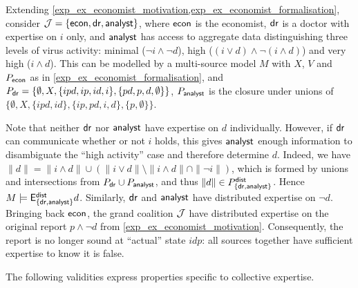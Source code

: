 \begin{example}
\label{exp_ex_mutlisource}

    Extending \cref{exp_ex_economist_motivation,exp_ex_economist_formalisation},
    consider $\mathcal{J} = \{\mathsf{econ}, \mathsf{dr}, \mathsf{analyst}\}$, where $\mathsf{econ}$ is the economist,
    $\mathsf{dr}$ is a doctor with expertise on $i$ only, and $\mathsf{analyst}$ has access to
    aggregate data distinguishing three levels of virus activity: minimal
    ($\neg i \land \neg d$), high ($(i \lor d) \land \neg(i \land d)$) and very
    high ($i \land d$). This can be modelled by a multi-source model $M$ with
    $X$, $V$ and $P_{\mathsf{econ}}$ as in \cref{exp_ex_economist_formalisation}, and $P_{\mathsf{dr}}
    = \{\emptyset, X, \{ipd, ip, id, i\}, \{pd, p, d, \emptyset\}\}$,
    $P_{\mathsf{analyst}}$ is the closure under unions of $\{\emptyset, X, \{ipd, id\},
    \{ip, pd, i, d\}, \{p, \emptyset\}\}$.

    Note that neither $\mathsf{dr}$ nor $\mathsf{analyst}$ have expertise on $d$ individually.
    However, if $\mathsf{dr}$ can communicate whether or not $i$ holds, this gives
    $\mathsf{analyst}$ enough information to disambiguate the ``high activity'' case
    and therefore determine $d$. Indeed, we have $\|d\| = \|i \land d\| \cup
    (\|i \lor d\| \setminus \|i \land d\| \cap \|\neg i\|)$, which is formed by
    unions and intersections from $P_{\mathsf{dr}} \cup P_{\mathsf{analyst}}$, and thus $\|d\| \in
    P^{\mathsf{dist}}_{\{\mathsf{dr}, \mathsf{analyst}\}}$. Hence $M \models \mathsf{E}_{\{\mathsf{dr}, \mathsf{analyst}\}}^{\mathsf{dist}}
    d$.
    Similarly, $\mathsf{dr}$ and $\mathsf{analyst}$ have distributed expertise on $\neg d$.
    Bringing back $\mathsf{econ}$, the grand coalition $\mathcal{J}$ have distributed expertise
    on the original report $p \land \neg d$ from
    \cref{exp_ex_economist_motivation}. Consequently, the report is no longer sound
    at ``actual'' state $idp$: all sources together have sufficient expertise to
    know it is false.

\end{example}

The following validities express properties
specific to collective expertise.


